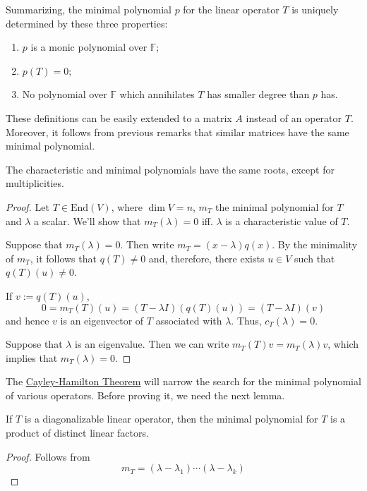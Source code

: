 Summarizing, the minimal polynomial $p$ for the linear operator $T$ is uniquely determined by these three properties:
\begin{enumerate}
	\item $p$ is a monic polynomial over $\mathbb{F}$;
	\item $p(T) = 0$;
	\item No polynomial over $\mathbb{F}$ which annihilates $T$ has smaller degree than $p$ has.
\end{enumerate}

These definitions can be easily extended to a matrix $A$ instead of an operator $T$. Moreover, it follows from previous remarks that similar matrices have the same minimal polynomial.

\begin{theorem}
	The characteristic and minimal polynomials have the same roots, except for multiplicities.
\end{theorem}

\begin{proof}
	Let $T \in \text{End}(V)$, where $\dim V = n$, $m_T$ the minimal polynomial for $T$ and $\lambda$ a scalar. We'll show that $m_T(\lambda) = 0$ iff. $\lambda$ is a characteristic value of $T$.

	Suppose that $m_T(\lambda) = 0$. Then write $m_T = (x-\lambda)q(x)$. By the minimality of $m_T$, it follows that $q(T) \neq 0$ and, therefore, there exists $u \in V$ such that $q(T)(u) \neq 0$.
	
	If $v := q(T)(u)$,
	\[
		0 = m_T(T)(u) = (T - \lambda I)(q(T)(u)) = (T - \lambda I)(v)
	\]
	and hence $v$ is an eigenvector of $T$ associated with $\lambda$. Thus, $c_T(\lambda) = 0$.

	Suppose that $\lambda$ is an eigenvalue. Then we can write $m_T(T)v = m_T(\lambda)v$, which implies that $m_T(\lambda) = 0$.
\end{proof}

The \hyperref[thm:cayley-hamilton]{Cayley-Hamilton Theorem} will narrow the search for the minimal polynomial of various operators. Before proving it, we need the next lemma.

\begin{lemma}
	If $T$ is a diagonalizable linear operator, then the minimal polynomial for $T$ is a product of distinct linear factors.
\end{lemma}

\begin{proof}
	Follows from 
	\[
		m_T = (\lambda - \lambda_1) \cdots (\lambda - \lambda_k)
	\]
\end{proof}

